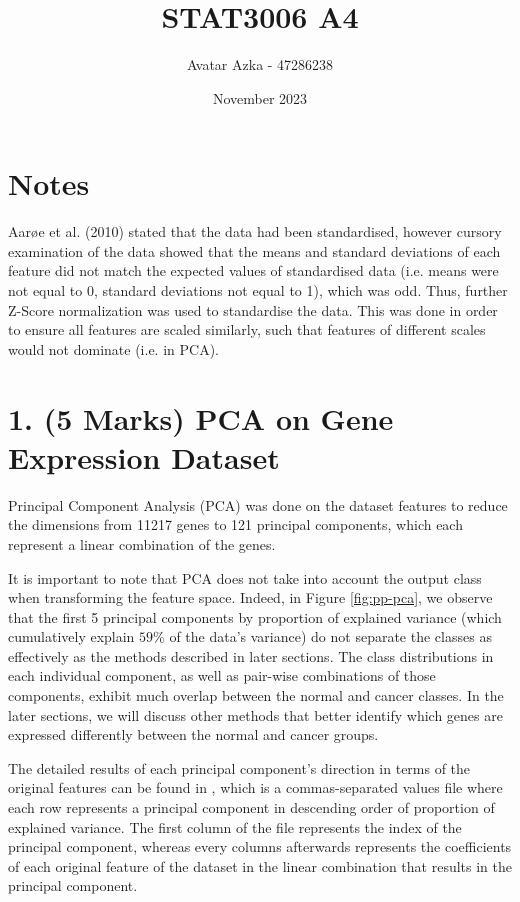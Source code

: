 \documentclass[twocolumn]{article}
\title{STAT3006 A4}
\author{Avatar Azka - 47286238}
\date{November 2023}
\begin{document}
\onecolumn
\maketitle
{
    \hypersetup{linkcolor=black}
    \tableofcontents
}

\newpage
\twocolumn
\section{Notes}

Aarøe et al. (2010) \cite{Aarøe2010} stated that the data had been standardised, however cursory examination of the data showed that the means and standard deviations of each feature did not match the expected values of standardised data (i.e. means were not equal to 0, standard deviations not equal to 1), which was odd. Thus, further Z-Score normalization was used to standardise the data. This was done in order to ensure all features are scaled similarly, such that features of different scales would not dominate (i.e. in PCA). 

\section{1. (5 Marks) PCA on Gene Expression Dataset}
Principal Component Analysis (PCA) was done on the dataset features to reduce the dimensions from 11217 genes to 121 principal components, which each represent a linear combination of the genes.

It is important to note that PCA does not take into account the output class when transforming the feature space. Indeed, in Figure \ref{fig:pp-pca}, we observe that the first 5 principal components by proportion of explained variance (which cumulatively explain $59\%$ of the data's variance) do not separate the classes as effectively as the methods described in later sections. The class distributions in each individual component, as well as pair-wise combinations of those components, exhibit much overlap between the normal and cancer classes. In the later sections, we will discuss other methods that better identify which genes are expressed differently between the normal and cancer groups.

The detailed results of each principal component's direction in terms of the original features can be found in , which is a commas-separated values file where each row represents a principal component in descending order of proportion of explained variance. The first column of the file represents the index of the principal component, whereas every columns afterwards represents the coefficients of each original feature of the dataset in the linear combination that results in the principal component.
\end{document}
